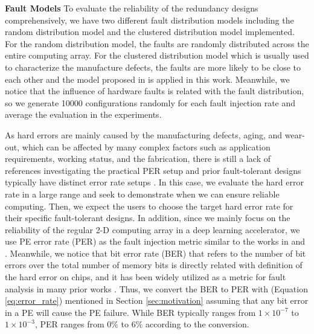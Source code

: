 \textbf{Fault Models} To evaluate the reliability of the redundancy designs comprehensively, we have two different fault distribution models including the random distribution model and the clustered distribution model implemented. For the random distribution model, the faults are randomly distributed across the entire computing array. For the clustered distribution model which is usually used to characterize the manufacture defects, the faults are more likely to be close to each other and the model proposed in \cite{meyer1989modeling} is applied in this work. Meanwhile, we notice that the influence of hardware faults is related with the fault distribution, so we generate 10000 configurations randomly for each fault injection rate and average the evaluation in the experiments. 

As hard errors are mainly caused by the manufacturing defects, aging, and wear-out, which can be affected by many complex factors such as application requirements, working status, and the fabrication, there is still a lack of references investigating the practical PER setup and prior fault-tolerant designs typically have distinct error rate setups \cite{liu2011resilient, li2008understanding, abdullah2020salvagednn, analyzing2018vts}. In this case, we evaluate the hard error rate in a large range and seek to demonstrate when we can ensure reliable computing. Then, we expect the users to choose the target hard error rate for their specific fault-tolerant designs. In addition, since we mainly focus on the reliability of the regular 2-D computing array in a deep learning accelerator, we use PE error rate (PER) as the fault injection metric similar to the works in \cite{zhang2018analyzing} and \cite{qian2016optimal}. Meanwhile, we notice that bit error rate (BER) that refers to the number of bit errors over the total number of memory bits is directly related with definition of the hard error on chips, and it has been widely utilized as a metric for fault analysis in many prior works \cite{mittal2020survey}\cite{neggaz2018reliability}\cite{ares2018dac}. Thus, we convert the BER to PER with (Equation \ref{eq:error_rate}) mentioned in Section \ref{sec:motivation} assuming that any bit error in a PE will cause the PE failure. While BER typically ranges from $1 \times 10^{-7}$ to $1 \times 10^{-3}$, PER ranges from 0$\%$ to 6$\%$ according to the conversion.  


